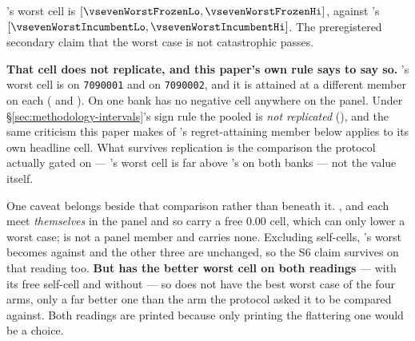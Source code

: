 \begin{table}[t]\centering
\caption{Worst cell per arm over the shared panel. This is the headline and it is printed first.}
\label{tab:worstcase}
{\small}
\end{table}

\frozen{}'s worst cell is \vsevenWorstFrozen{}
$[\vsevenWorstFrozenLo, \vsevenWorstFrozenHi]$, against \incumbent{}'s \vsevenWorstIncumbent{}
$[\vsevenWorstIncumbentLo, \vsevenWorstIncumbentHi]$. The preregistered secondary claim that the worst
case is not catastrophic passes.

\textbf{That cell does not replicate, and this paper's own rule says to say so.} \frozen{}'s worst
cell is \vsevenWorstFrozenBankOne{} on \texttt{7090001} and \vsevenWorstFrozenBankTwo{} on
\texttt{7090002}, and it is attained at a different member on each
(\texttt{\vsevenWorstFrozenBankOneOpp{}} and \texttt{\vsevenWorstFrozenBankTwoOpp{}}). On one bank
\frozen{} has no negative cell anywhere on the panel. Under \S\ref{sec:methodology-intervals}'s sign
rule the pooled \vsevenWorstFrozen{} is \emph{not replicated}
(\vsevenWorstFrozenRepl{}), and the same criticism this paper makes of \incumbent{}'s
regret-attaining member below applies to its own headline cell. What survives replication is the
comparison the protocol actually gated on --- \frozen{}'s worst cell is far above \incumbent{}'s on
both banks --- not the value \vsevenWorstFrozen{} itself.

One caveat belongs beside that comparison rather than beneath it. \incumbent{}, \fcheap{} and
\composite{} each meet \emph{themselves} in the panel and so carry a free $0.00$ cell, which can only
lower a worst case; \frozen{} is not a panel member and carries none. Excluding self-cells,
\composite{}'s worst becomes
\vsevenWorstCompositeExSelf{} against \vsevenWorstCompositeExSelfOpp{} and the other three are
unchanged, so the S6 claim survives on that reading too. \textbf{But \composite{} has the better
worst cell on both readings} --- \vsevenWorstComposite{} with its free self-cell and
\vsevenWorstCompositeExSelf{} without --- so \frozen{} does not have the best worst case of the four
arms, only a far better one than the arm the protocol asked it to be compared against. Both readings
are printed because only printing the flattering one would be a choice.

\begin{table}[t]\centering
\caption{Minimax regret over the shared panel, best first. The protocol sets no threshold on this
quantity; it requires it to be reported and to lead. It does not favour the frozen configuration.}
\label{tab:regret}

\end{table}

